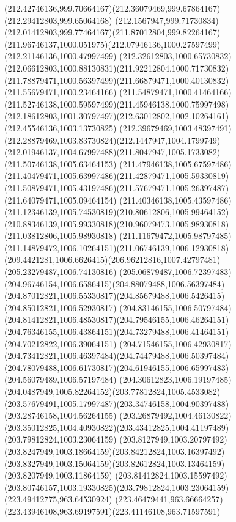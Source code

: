 {{	\curveto(212.42746136,999.70664167)(212.36079469,999.67864167)(212.29412803,999.65064168)
	\curveto(212.1567947,999.71730834)(212.01412803,999.77464167)(211.87012804,999.82264167)
	\curveto(211.96746137,1000.051975)(212.07946136,1000.27597499)(212.21146136,1000.47997499)
	\curveto(212.32612803,1000.65730832)(212.06612803,1000.88130831)(211.92212804,1000.71730832)
	\curveto(211.78879471,1000.56397499)(211.66879471,1000.40130832)(211.55679471,1000.23464166)
	\curveto(211.54879471,1000.41464166)(211.52746138,1000.59597499)(211.45946138,1000.75997498)
	\curveto(212.18612803,1001.30797497)(212.63012802,1002.10264161)(212.45546136,1003.13730825)
	\curveto(212.39679469,1003.48397491)(212.28879469,1003.83730824)(212.1447947,1004.1799749)
	\curveto(212.01946137,1004.67997488)(211.8047947,1005.1733082)(211.50746138,1005.63464153)
	\curveto(211.47946138,1005.67597486)(211.40479471,1005.63997486)(211.42879471,1005.59330819)
	\curveto(211.50879471,1005.43197486)(211.57679471,1005.26397487)(211.64079471,1005.09464154)
	\curveto(211.40346138,1005.43597486)(211.12346139,1005.74530819)(210.80612806,1005.99464152)
	\curveto(210.88346139,1005.99330818)(210.96079473,1005.98930818)(211.03812806,1005.98930818)
	\curveto(211.11679472,1005.98797485)(211.14879472,1006.10264151)(211.06746139,1006.12930818)
	\curveto(209.4421281,1006.6626415)(206.96212816,1007.42797481)(205.23279487,1006.74130816)
	\curveto(205.06879487,1006.72397483)(204.96746154,1006.6586415)(204.88079488,1006.56397484)
	\curveto(204.87012821,1006.55330817)(204.85679488,1006.5426415)(204.85012821,1006.52930817)
	\curveto(204.83146155,1006.50797484)(204.81412821,1006.48530817)(204.79546155,1006.46264151)
	\curveto(204.76346155,1006.43864151)(204.73279488,1006.41464151)(204.70212822,1006.39064151)
	\curveto(204.71546155,1006.42930817)(204.73412821,1006.46397484)(204.74479488,1006.50397484)
	\curveto(204.78079488,1006.61730817)(204.61946155,1006.65997483)(204.56079489,1006.57197484)
	\curveto(204.30612823,1006.19197485)(204.0487949,1005.82264152)(203.77812824,1005.4533082)
	\curveto(203.57679491,1005.17997487)(203.34746158,1004.90397488)(203.28746158,1004.56264155)
	\curveto(203.26879492,1004.46130822)(203.35012825,1004.40930822)(203.43412825,1004.41197489)
	\moveto(203.79812824,1003.23064159)
	\curveto(203.8127949,1003.20797492)(203.8247949,1003.18664159)(203.84212824,1003.16397492)
	\curveto(203.8327949,1003.15064159)(203.82612824,1003.13464159)(203.8207949,1003.11864159)
	\curveto(203.81412824,1003.15597492)(203.80746157,1003.19330825)(203.79812824,1003.23064159)
	\moveto(223.49412775,963.64530924)
	\curveto(223.46479441,963.66664257)(223.43946108,963.69197591)(223.41146108,963.71597591)
}}
